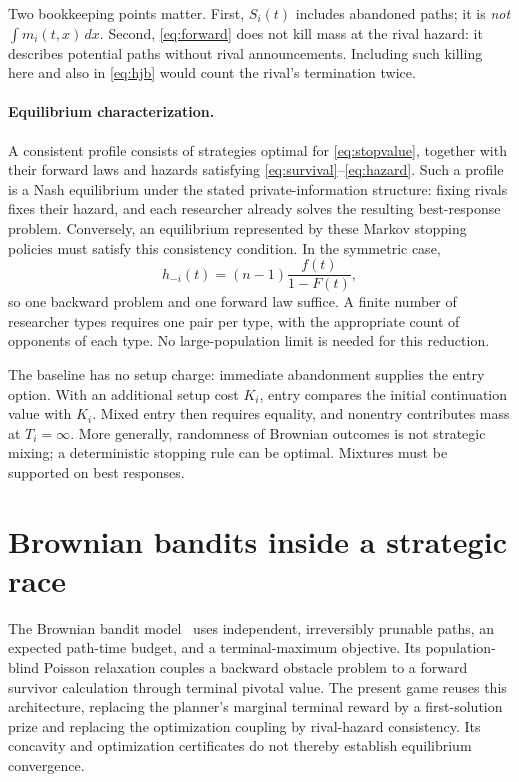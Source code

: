 \documentclass[11pt]{article}
\begin{document}
Two bookkeeping points matter. First, $S_i(t)$ includes abandoned paths;
it is \emph{not} $\int m_i(t,x)\,dx$. Second, \eqref{eq:forward} does not
kill mass at the rival hazard: it describes potential paths without rival
announcements. Including such killing here and also in \eqref{eq:hjb}
would count the rival's termination twice.

\paragraph{Equilibrium characterization.}
A consistent profile consists of strategies optimal for
\eqref{eq:stopvalue}, together with their forward laws and hazards satisfying
\eqref{eq:survival}--\eqref{eq:hazard}. Such a profile is a Nash equilibrium
under the stated private-information structure: fixing rivals fixes their
hazard, and each researcher already solves the resulting best-response
problem. Conversely, an equilibrium represented by these Markov stopping
policies must satisfy this consistency condition. In the symmetric case,
\begin{equation}\label{eq:symmetricdynamic}
h_{-i}(t)=(n-1)\frac{f(t)}{1-F(t)},
\end{equation}
so one backward problem and one forward law suffice. A finite number of
researcher types requires one pair per type, with the appropriate count of
opponents of each type. No large-population limit is needed for this reduction.

The baseline has no setup charge: immediate abandonment supplies the entry
option. With an additional setup cost $K_i$, entry compares the initial
continuation value with $K_i$. Mixed entry then requires equality, and
nonentry contributes mass at $T_i=\infty$. More generally, randomness of
Brownian outcomes is not strategic mixing; a deterministic stopping rule
can be optimal. Mixtures must be supported on best responses.

\section{Brownian bandits inside a strategic race}
The Brownian bandit model~\cite{cotton} uses independent, irreversibly
prunable paths, an expected path-time budget, and a terminal-maximum
objective. Its population-blind Poisson relaxation couples a backward
obstacle problem to a forward survivor calculation through terminal
pivotal value. The present game reuses this architecture, replacing the
planner's marginal terminal reward by a first-solution prize and replacing
the optimization coupling by rival-hazard consistency. Its concavity and
optimization certificates do not thereby establish equilibrium convergence.
\end{document}
